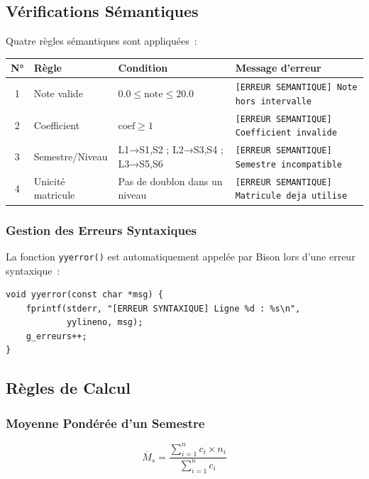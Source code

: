 \documentclass[a4paper,12pt]{article}
\begin{document}
\subsection{Vérifications Sémantiques}

Quatre règles sémantiques sont appliquées~:

\begin{center}
\renewcommand{\arraystretch}{1.3}
\begin{tabular}{clll}
\toprule
\textbf{N°} & \textbf{Règle} & \textbf{Condition} & \textbf{Message d'erreur} \\
\midrule
1 & Note valide      & $0.0 \le \text{note} \le 20.0$  & \texttt{[ERREUR SEMANTIQUE] Note hors intervalle} \\
2 & Coefficient      & $\text{coef} \ge 1$             & \texttt{[ERREUR SEMANTIQUE] Coefficient invalide} \\
3 & Semestre/Niveau  & L1→S1,S2 ; L2→S3,S4 ; L3→S5,S6 & \texttt{[ERREUR SEMANTIQUE] Semestre incompatible} \\
4 & Unicité matricule & Pas de doublon dans un niveau   & \texttt{[ERREUR SEMANTIQUE] Matricule deja utilise} \\
\bottomrule
\end{tabular}
\end{center}

\subsubsection{Gestion des Erreurs Syntaxiques}

La fonction \texttt{yyerror()} est automatiquement appelée par Bison lors d'une erreur syntaxique~:

\begin{lstlisting}[caption={Fonction yyerror}, style=c, label=lst:yyerror]
void yyerror(const char *msg) {
    fprintf(stderr, "[ERREUR SYNTAXIQUE] Ligne %d : %s\n",
            yylineno, msg);
    g_erreurs++;
}
\end{lstlisting}

\subsection{Règles de Calcul}

\subsubsection{Moyenne Pondérée d'un Semestre}

\begin{equation}
  \overline{M}_s = \frac{\displaystyle\sum_{i=1}^{n} c_i \times n_i}{\displaystyle\sum_{i=1}^{n} c_i}
  \label{eq:moy-sem}
\end{equation}
\end{document}
